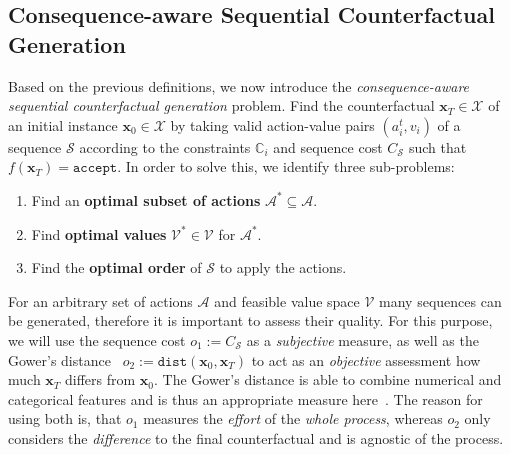 \documentclass[runningheads, envcountsame, a4paper]{llncs}
\newcommand{\actions}{\mathcal{A}}
\newcommand{\action}{a}
\newcommand{\Values}{\mathcal{V}}
\newcommand{\Value}{v}
\newcommand{\state}{\mathbf{x}}
\newcommand{\initialinstance}{\state_{0}}
\newcommand{\targetclass}{\texttt{accept}}
\newcommand{\featurespace}{\mathcal{X}}
\newcommand{\constraint}{\mathbb{C}}
\newcommand{\sequence}{\mathcal{S}}
\newcommand{\objective}{o}
\newcommand{\seqCosts}{\objective_{1}}
\newcommand{\seqDistance}{\objective_{2}}
\newcommand{\blackbox}{f}
\newcommand{\totalCosts}{C}
\newcommand{\finalsolution}{\state_{T}}
\begin{document}
\subsection{Consequence-aware Sequential Counterfactual Generation}
\label{sec:moo_problem}
Based on the previous definitions, we now introduce the \emph{consequence-aware sequential counterfactual generation} problem. Find the counterfactual $\finalsolution \in \featurespace$ of an initial instance $\initialinstance \in \featurespace$ by taking valid action-value pairs $(\action_i^t, \Value_i)$ of a sequence $\sequence$ according to the constraints $\constraint_i$ and sequence cost $\totalCosts_\sequence$ such that $\blackbox(\finalsolution) = \targetclass$. In order to solve this, we identify three sub-problems:
\begin{enumerate}[label=\textbf{Problem~\arabic*} (Prob.~\arabic*):, ref=Prob.~\arabic*, align=left]
    \item\label{prob:1} Find an \textbf{optimal subset of actions} $\actions^* \subseteq \actions$.
    \item\label{prob:2} Find \textbf{optimal values} $\Values^* \in \Values$ for $\actions^*$.
    \item\label{prob:3} Find the \textbf{optimal order} of $\sequence$ to apply the actions.
\end{enumerate}

For an arbitrary set of actions $\actions$ and feasible value space $\Values$ many sequences can be generated, therefore it is important to assess their quality. For this purpose, we will use the sequence cost $\seqCosts := \totalCosts_\sequence$ as a \emph{subjective} measure, as well as the Gower's distance~\cite{gowerGeneralCoefficientSimilarity1971} $\seqDistance := \texttt{dist}(\initialinstance,\finalsolution)$ to act as an \emph{objective} assessment how much $\finalsolution$ differs from $\initialinstance$. The Gower's distance is able to combine numerical and categorical features and is thus an appropriate measure here~\cite{dandlMultiObjectiveCounterfactualExplanations2020a}. The reason for using both is, that $\seqCosts$ measures the \emph{effort} of the \emph{whole process}, whereas $\seqDistance$ only considers the \emph{difference} to the final counterfactual and is agnostic of the process.
\end{document}
